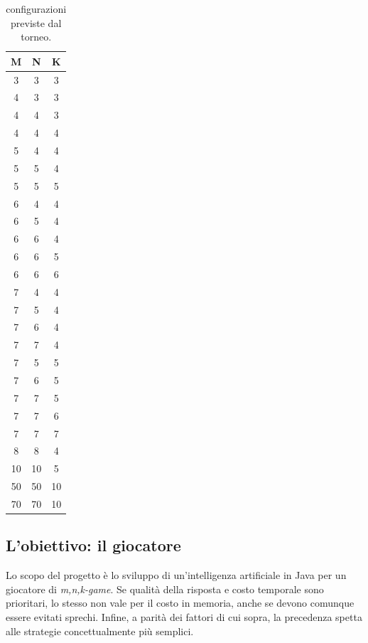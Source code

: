\documentclass{article}
\begin{document}
\begin{table}[h!]
\centering
\begin{tabular}{ | c | c | c | }
  \hline
  M & N & K \\
  \hline
  3 & 3 & 3 \\
  \hline
  4 & 3 & 3 \\
  \hline
  4 & 4 & 3 \\
  \hline
  4 & 4 & 4 \\
  \hline
  5 & 4 & 4 \\
  \hline
  5 & 5 & 4 \\
  \hline
  5 & 5 & 5 \\
  \hline
  6 & 4 & 4 \\
  \hline
  6 & 5 & 4 \\
  \hline
  6 & 6 & 4 \\
  \hline
  6 & 6 & 5 \\
  \hline
  6 & 6 & 6 \\
  \hline
  7 & 4 & 4 \\
  \hline
  7 & 5 & 4 \\
  \hline
  7 & 6 & 4 \\
  \hline
  7 & 7 & 4 \\
  \hline
  7 & 5 & 5 \\
  \hline
  7 & 6 & 5 \\
  \hline
  7 & 7 & 5 \\
  \hline
  7 & 7 & 6 \\
  \hline
  7 & 7 & 7 \\
  \hline
  8 & 8 & 4 \\
  \hline
  10 & 10 & 5 \\
  \hline
  50 & 50 & 10 \\
  \hline
  70 & 70 & 10 \\
  \hline
\end{tabular}
  \caption{configurazioni previste dal torneo.}
  \label{table:1}
\end{table}

\subsection{L'obiettivo: il giocatore}

Lo scopo del progetto è lo sviluppo di un'intelligenza artificiale in Java per
un giocatore di \emph{m,n,k-game}. Se qualità della risposta e costo temporale
sono prioritari, lo stesso non vale per il costo in memoria, anche se devono
comunque essere evitati sprechi. Infine, a parità dei fattori di cui sopra, la
precedenza spetta alle strategie concettualmente più semplici.
\end{document}
